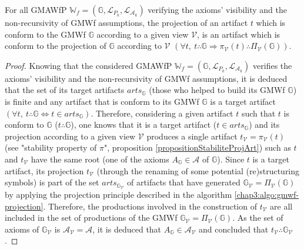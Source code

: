 \begin{proposition}
	\label{propositionCoherenceArtefact}
	For all GMAWfP $\mathbb{W}_f=\left(\mathbb{G}, \mathcal{L}_{P_k}, \mathcal{L}_{\mathcal{A}_k} \right)$ verifying the axioms' visibility and the non-recursivity of GMWf assumptions, the projection of an artifact $t$ which is conform to the GMWf $\mathbb{G}$ according to a given view $\mathcal{V}$, is an artifact which is conform to the projection of $\mathbb{G}$ according to $\mathcal{V}$ $\left(\forall t, ~t \therefore \mathbb{G} \Rightarrow \pi_{\mathcal{V}}\left(t\right) \therefore \Pi_{\mathcal{V}}\left(\mathbb{G} \right)\right)$.
\end{proposition}

\begin{proof}
	Knowing that the considered GMAWfP $\mathbb{W}_f=\left(\mathbb{G}, \mathcal{L}_{P_k}, \mathcal{L}_{\mathcal{A}_k} \right)$ verifies the axioms' visibility and the non-recursivity of GMWf assumptions, it is deduced that the set of its target artifacts $arts_{\mathbb{G}}$ (those who helped to build its GMWf $\mathbb{G}$) is finite and any artifact that is conform to its GMWf $\mathbb{G}$ is a target artifact $\left( \forall t, ~t \therefore \mathbb{G} \Leftrightarrow t \in arts_{\mathbb{G}} \right)$. Therefore, considering a given artifact $t$ such that $t$ is conform to $\mathbb{G}$ ($t \therefore \mathbb{G}$), one knows that it is a target artifact ($t \in arts_{\mathbb{G}}$) and its projection according to a given view $\mathcal{V}$ produces a single artifact $t_{\mathcal{V}}=\pi_{\mathcal{V}}\left(t\right)$ (see "stability property of $\pi$", proposition \ref{propositionStabiliteProjArt}) such as $t$ and $t_{\mathcal{V}}$ have the same root (one of the axioms $A_{\mathbb{G}} \in \mathcal{A}$ of $\mathbb{G}$). Since $t$ is a target artifact, its projection $t_{\mathcal{V}}$ (through the renaming of some potential (re)structuring symbols) is part of the set $arts_{\mathbb{G}_{\mathcal{V}}}$ of artifacts that have generated $\mathbb{G}_{\mathcal{V}} = \Pi_{\mathcal{V}}\left(\mathbb{G} \right)$ by applying the projection principle described in the algorithm \ref{chap3:algo:gmwf-projection}. Therefore, the productions involved in the construction of $t_{\mathcal{V}}$ are all included in the set of productions of the GMWf $\mathbb{G}_{\mathcal{V}} = \Pi_{\mathcal{V}}\left(\mathbb{G} \right)$. As the set of axioms of $\mathbb{G}_{\mathcal{V}}$ is $\mathcal{A}_{\mathcal{V}} = \mathcal{A}$, it is deduced that $A_{\mathbb{G}} \in \mathcal{A}_{\mathcal{V}}$ and concluded that $t_{\mathcal{V}} \therefore \mathbb{G}_{\mathcal{V}}$.
\end{proof}

